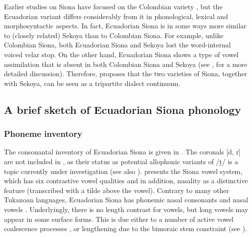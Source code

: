 \documentclass[output=paper]{langscibook}
\begin{document}
Earlier studies on Siona have focused on the Colombian variety \citep{Wheeler:1967, Wheeler:1970, Wheeler:1987a, Wheeler:1987b, Wheeler:2000, WheelerWheeler:1975}, but the Ecuadorian variant differs considerably from it in phonological, lexical and morphosyntactic aspects. In fact, Ecuadorian Siona is in some ways more similar to (closely related) Sekoya than to Colombian Siona. For example, unlike Colombian Siona, both Ecuadorian Siona and Sekoya lost the word-internal voiced velar stop. On the other hand, Ecuadorian Siona shows a type of vowel assimilation that is absent in both Colombian Siona and Sekoya  (see \citealt[10--12]{Bruil:2014}, for a more detailed discussion). Therefore, \citet{Bruil:2014} proposes that the two varieties of Siona, together with Sekoya, can be seen as a tripartite dialect continuum.

\subsection{A brief sketch of Ecuadorian Siona phonology}\label{sec-phonBG}

\subsubsection{Phoneme inventory}
The consonantal inventory of Ecuadorian Siona is given in .  The coronals [d, ɾ] are not included in , as their status as potential allophonic variants of \mbox{/t̰/} is a topic currently under investigation (see also ).  presents the Siona vowel system, which has six contrastive vowel qualities and in addition, nasality as a distinctive feature (transcribed with a tilde above the vowel). Contrary to many other Tukanoan languages, Ecuadorian Siona has phonemic nasal consonants and nasal vowels \citep{BruilStewart:2022}. Underlyingly, there is no length contrast for vowels, but long vowels may appear in some surface forms. This is due either to a number of active vowel coalescence processes \citep[115--117]{Bruil:2014}, or lengthening due to the bimoraic stem constraint (see ).
\end{document}
